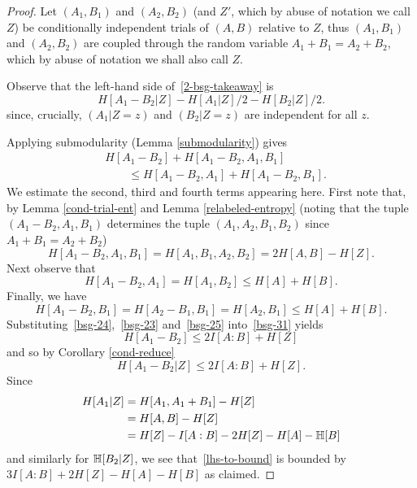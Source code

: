 \begin{proof}
Let $(A_1, B_1)$ and $(A_2, B_2)$ (and $Z'$, which by abuse of notation we call $Z$) be conditionally independent trials of $(A,B)$ relative to $Z$, thus $(A_1,B_1)$ and $(A_2,B_2)$ are coupled through the random variable $A_1 + B_1 = A_2 + B_2$, which by abuse of notation we shall also call $Z$.

Observe that the left-hand side of~\eqref{2-bsg-takeaway} is
\begin{equation}\label{lhs-to-bound}
H[A_1 - B_2| Z] - H[A_1 | Z]/2 - H[B_2 | Z]/2.
\end{equation}
since, crucially, $(A_1 | Z=z)$ and $(B_2 | Z=z)$ are independent for all $z$.

Applying submodularity (Lemma \ref{submodularity}) gives
\begin{equation}\label{bsg-31} \begin{split}
&H[A_1 - B_2] + H[A_1 - B_2, A_1, B_1] \\
&\qquad \leq H[A_1 - B_2, A_1] + H[A_1 - B_2,B_1].
\end{split}\end{equation}
We estimate the second, third and fourth terms appearing here.
First note that, by Lemma \ref{cond-trial-ent} and Lemma \ref{relabeled-entropy} (noting that the tuple $(A_1 - B_2, A_1, B_1)$  determines the tuple $(A_1, A_2, B_1, B_2)$ since $A_1+B_1=A_2+B_2$)
\begin{equation}\label{bsg-24} H[A_1 - B_2, A_1, B_1] = H[A_1, B_1, A_2, B_2] = 2H[A,B] - H[Z].\end{equation}
Next observe that
\begin{equation}\label{bsg-23} H[A_1 - B_2, A_1] = H[A_1, B_2] \leq H[A] + H[B].
\end{equation}
Finally, we have
\begin{equation}\label{bsg-25} H[A_1 - B_2, B_1] = H[A_2 - B_1, B_1] = H[A_2, B_1] \leq H[A] + H[B].\end{equation}
Substituting~\eqref{bsg-24},~\eqref{bsg-23} and~\eqref{bsg-25} into~\eqref{bsg-31} yields
\[ H[A_1 - B_2] \leq 2I[A:B] + H[Z]\] and so by Corollary \ref{cond-reduce}
\[H[A_1 - B_2 | Z]  \leq 2I[A:B] + H[Z].\]
Since
\begin{align*} H[A_1 | Z] & = H[A_1, A_1 + B_1] - H[Z] \\ & = H[A,B] - H[Z] \\ & = H[Z] - I[A:B] - 2 H[Z]-H[A]-\mathbb{H}[B]\end{align*}
and similarly for $\mathbb{H}[B_2 | Z]$, we see that~\eqref{lhs-to-bound} is bounded by
$3I[A:B] + 2H[Z]-H[A]-H[B]$ as claimed.
\end{proof}


